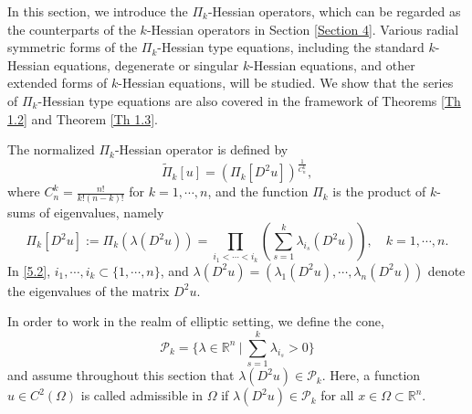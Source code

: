 \documentclass[a4paper,11pt]{amsart}
\theoremstyle{plain}
\theoremstyle{remark}
\numberwithin{equation}{section}
\numberwithin{figure}{section}
\numberwithin{remark}{section}
\begin{document}
\begin{sloppypar}
In this section, we introduce the $\Pi_k$-Hessian operators, which can be regarded as the counterparts of the $k$-Hessian operators in Section \ref{Section 4}. Various radial symmetric forms of  the $\Pi_k$-Hessian type equations, including the standard $k$-Hessian equations, degenerate or singular $k$-Hessian equations, and other extended forms of $k$-Hessian equations, will be studied. We show that the series of $\Pi_k$-Hessian type equations are also covered in the framework of Theorems \ref{Th 1.2} and Theorem \ref{Th 1.3}.

The normalized $\Pi_k$-Hessian operator is defined by
	\begin{equation}\label{5.1}
	\tilde \Pi_k[u] = (\Pi_k[D^2u])^{\frac{1}{C_n^k}},
	\end{equation}
where $C_n^k = \frac{n!}{k!(n-k)!}$ for $k=1, \cdots, n$, and the function $\Pi_k$ is the product of $k$-sums of eigenvalues, namely
	\begin{equation}\label{5.2}
	\Pi_k[D^2u]:= \Pi_k(\lambda (D^2u)) = \prod_{i_1<\cdots<i_k} \left ( \sum_{s=1}^k \lambda_{i_s}(D^2u) \right ), \quad k=1, \cdots, n.
	\end{equation}
In \eqref{5.2}, $i_1, \cdots, i_k \subset \{1, \cdots, n\}$, and $\lambda(D^2u) = (\lambda_1(D^2u), \cdots, \lambda_n(D^2u))$ denote the eigenvalues of the matrix $D^2u$.

In order to work in the realm of elliptic setting, we define the cone,
	\begin{equation}\label{5.3}
	\mathcal{P}_k = \{ \lambda \in \mathbb{R}^n \ | \ \sum_{s=1}^k \lambda_{i_s}>0\}
	\end{equation}
and  assume throughout this section that $\lambda(D^2u)\in \mathcal{P}_{k}$.
Here, a function $u\in C^2(\Omega)$ is called admissible in $\Omega$ if $\lambda(D^2u)\in \mathcal{P}_{k}$ for all $x\in \Omega\subset \mathbb{R}^n$.



\end{sloppypar}
\end{document}
